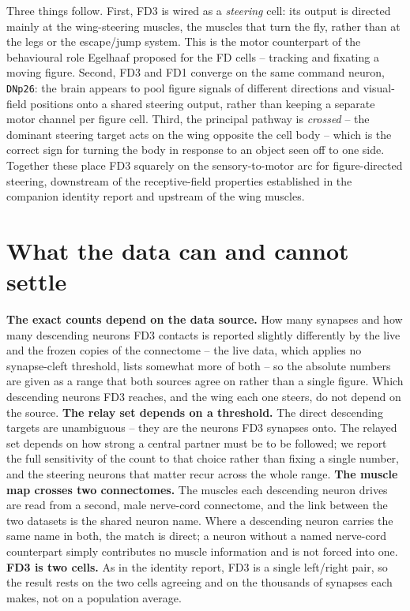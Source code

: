\documentclass[11pt]{article}
\newcommand{\ttt}[1]{\texttt{#1}}
\begin{document}
Three things follow. First, FD3 is wired as a \emph{steering} cell: its output is directed mainly at the wing-steering muscles, the muscles that turn the fly, rather than at the legs or the escape/jump system. This is the motor counterpart of the behavioural role Egelhaaf proposed for the FD cells -- tracking and fixating a moving figure. Second, FD3 and FD1 converge on the same command neuron, \ttt{DNp26}: the brain appears to pool figure signals of different directions and visual-field positions onto a shared steering output, rather than keeping a separate motor channel per figure cell. Third, the principal pathway is \emph{crossed} -- the dominant steering target acts on the wing opposite the cell body -- which is the correct sign for turning the body in response to an object seen off to one side. Together these place FD3 squarely on the sensory-to-motor arc for figure-directed steering, downstream of the receptive-field properties established in the companion identity report and upstream of the wing muscles.

\section{What the data can and cannot settle}

\textbf{The exact counts depend on the data source.} How many synapses and how many descending neurons FD3 contacts is reported slightly differently by the live and the frozen copies of the connectome -- the live data, which applies no synapse-cleft threshold, lists somewhat more of both -- so the absolute numbers are given as a range that both sources agree on rather than a single figure. Which descending neurons FD3 reaches, and the wing each one steers, do not depend on the source. \textbf{The relay set depends on a threshold.} The direct descending targets are unambiguous -- they are the neurons FD3 synapses onto. The relayed set depends on how strong a central partner must be to be followed; we report the full sensitivity of the count to that choice rather than fixing a single number, and the steering neurons that matter recur across the whole range. \textbf{The muscle map crosses two connectomes.} The muscles each descending neuron drives are read from a second, male nerve-cord connectome, and the link between the two datasets is the shared neuron name. Where a descending neuron carries the same name in both, the match is direct; a neuron without a named nerve-cord counterpart simply contributes no muscle information and is not forced into one. \textbf{FD3 is two cells.} As in the identity report, FD3 is a single left/right pair, so the result rests on the two cells agreeing and on the thousands of synapses each makes, not on a population average.
\end{document}
